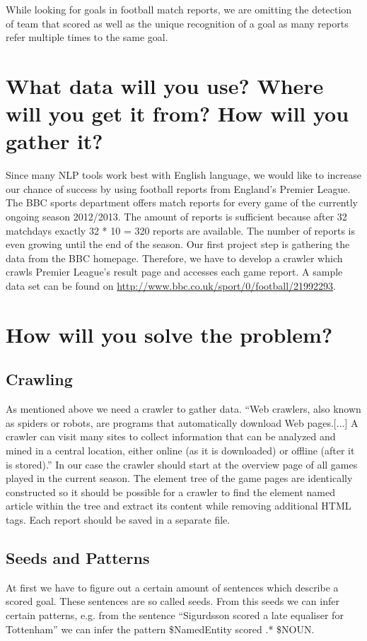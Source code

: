 \documentclass[11pt,titlepage,oneside,openany]{book}
\begin{document}
While looking for goals in football match reports, we are omitting the detection of team that scored as well as the unique recognition of a goal as many reports refer multiple times to the same goal.

\section{What data will you use? Where will you get it from? How will you gather it?}

Since many NLP tools work best with English language, we would like to increase our chance of success by using football reports from England's Premier League. The BBC sports department offers match reports for every game of the currently ongoing season 2012/2013. The amount of reports is sufficient because after 32 matchdays exactly 32 * 10 = 320 reports are available. The number of reports is even growing until the end of the season. Our first project step is gathering the data from the BBC homepage. Therefore, we have to develop a crawler which crawls Premier League's result page and accesses each game report. A sample data set can be found on \href{http://www.bbc.co.uk/sport/0/football/21992293}{http://www.bbc.co.uk/sport/0/football/21992293}.		
			
\section{How will you solve the problem?}
\subsection{Crawling}
As mentioned above we need a crawler to gather data. ``Web crawlers, also known as spiders or robots, are programs that automatically download Web pages.[...] A crawler can visit many sites to collect information that can be analyzed and mined in a central location, either online (as it is downloaded) or offline (after it is stored).'' \citep[p.311]{Liu2007} In our case the crawler should start at the overview page of all games played in the current season. The element tree of the game pages are identically constructed so it should be possible for a crawler to find the element named article within the tree and extract its content while removing additional HTML tags. Each report should be saved in a separate file. 

\subsection{Seeds and Patterns}
At first we have to figure out a certain amount of sentences which describe a scored goal. These sentences are so called seeds. 
From this seeds we can infer certain patterns, e.g. from the sentence ``Sigurdsson scored a late equaliser for Tottenham'' we can infer the pattern \$NamedEntity scored .* \$NOUN. 
\end{document}
